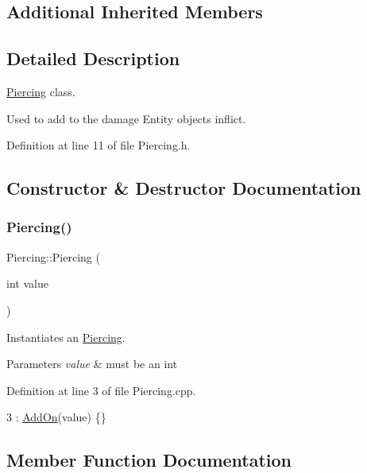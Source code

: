 \subsection*{Additional Inherited Members}


\subsection{Detailed Description}
\hyperlink{classPiercing}{Piercing} class. 

Used to add to the damage Entity objects inflict. 

Definition at line 11 of file Piercing.\+h.



\subsection{Constructor \& Destructor Documentation}
\mbox{\label{classPiercing_ad97c2ba97b49b1de3ac2d2c2253453fe}} 
\subsubsection{\texorpdfstring{Piercing()}{Piercing()}}
{\footnotesize\ttfamily Piercing\+::\+Piercing (\begin{DoxyParamCaption}\item[{int}]{value }\end{DoxyParamCaption})}



Instantiates an \hyperlink{classPiercing}{Piercing}. 


\begin{DoxyParams}{Parameters}
{\em value} & must be an int \\
\hline
\end{DoxyParams}


Definition at line 3 of file Piercing.\+cpp.


\begin{DoxyCode}
3 : \hyperlink{classAddOn_a64f23691b6c7fc49b6584f8f761ce4d9}{AddOn}(value) \{\}
\end{DoxyCode}


\subsection{Member Function Documentation}
\mbox{\label{classPiercing_aeb41b04515f5aad4d9f153b0de332849}} 
